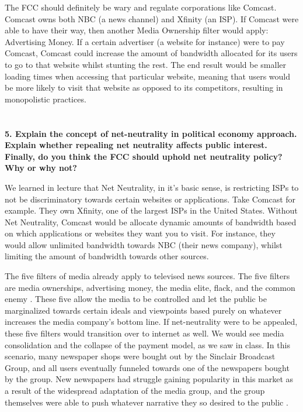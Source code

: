 \documentclass[a4paper]{article}
\begin{document}
        The FCC should definitely be wary and regulate corporations like Comcast. Comcast owns both NBC (a news channel) and Xfinity (an ISP). If Comcast were able to have their way, then another Media Ownership filter 
        would apply: Advertising Money. If a certain advertiser (a website for instance) were to pay Comcast, Comcast could increase the amount of bandwidth allocated for its users to go to that website whilst stunting 
        the rest. The end result would be smaller loading times when accessing that particular website, meaning that users would be more likely to visit that website as opposed to its competitors, resulting in monopolistic 
        practices. 


    \section{}
        \textbf{5. Explain the concept of net-neutrality in political economy approach. Explain whether repealing net neutrality affects public interest. Finally, do you think the FCC should uphold net neutrality policy? Why or why not? }
        
        We learned in lecture that Net Neutrality, in it’s basic sense, is restricting ISPs to not be discriminatory towards certain websites or applications. Take Comcast for example. They own Xfinity, one of the largest ISPs 
        in the United States. Without Net Neutrality, Comcast would be allocate dynamic amounts of bandwidth based on which applications or websites they want you to visit. For instance, they would allow unlimited bandwidth 
        towards NBC (their news company), whilst limiting the amount of bandwidth towards other sources. 

        The five filters of media already apply to televised news sources. The five filters are media ownerships, advertising money, the media elite, flack, and the common enemy \citep{video}. These five allow the 
        media to be controlled and let the public be marginalized towards certain ideals and viewpoints based purely on whatever increases the media company’s bottom line. If net-neutrality were to be appealed, these 
        five filters would transition over to internet as well. We would see media consolidation and the collapse of the payment model, as we saw in class. In this scenario, many newspaper shops were bought out by the 
        Sinclair Broadcast Group, and all users eventually funneled towards one of the newspapers bought by the group. New newspapers had struggle gaining popularity in this market as a result of the widespread adaptation 
        of the media group, and the group themselves were able to push whatever narrative they so desired to the public \citep{lesson8}. 
\end{document}
